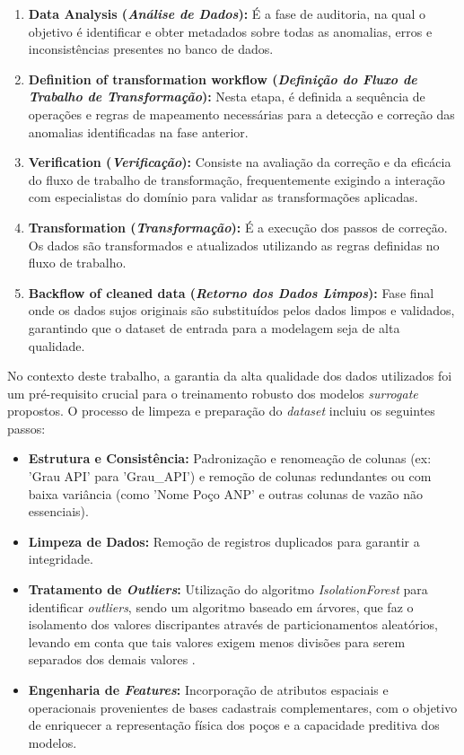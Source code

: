 \begin{enumerate}
    \item \textbf{Data Analysis (\textit{Análise de Dados}):} É a fase de auditoria, na qual o objetivo é identificar e obter metadados sobre todas as anomalias, erros e inconsistências presentes no banco de dados.
    \item \textbf{Definition of transformation workflow (\textit{Definição do Fluxo de Trabalho de Transformação}):} Nesta etapa, é definida a sequência de operações e regras de mapeamento necessárias para a detecção e correção das anomalias identificadas na fase anterior.
    \item \textbf{Verification (\textit{Verificação}):} Consiste na avaliação da correção e da eficácia do fluxo de trabalho de transformação, frequentemente exigindo a interação com especialistas do domínio para validar as transformações aplicadas.
    \item \textbf{Transformation (\textit{Transformação}):} É a execução dos passos de correção. Os dados são transformados e atualizados utilizando as regras definidas no fluxo de trabalho.
    \item \textbf{Backflow of cleaned data (\textit{Retorno dos Dados Limpos}):} Fase final onde os dados sujos originais são substituídos pelos dados limpos e validados, garantindo que o dataset de entrada para a modelagem seja de alta qualidade.
\end{enumerate}

No contexto deste trabalho, a garantia da alta qualidade dos dados utilizados foi um pré-requisito crucial para o treinamento robusto dos modelos \textit{surrogate} propostos. O processo de limpeza e preparação do \textit{dataset} incluiu os seguintes passos:

\begin{itemize}
    \item \textbf{Estrutura e Consistência:} Padronização e renomeação de colunas (ex: 'Grau API' para 'Grau\_API') e remoção de colunas redundantes ou com baixa variância (como 'Nome Poço ANP' e outras colunas de vazão não essenciais).
    \item \textbf{Limpeza de Dados:} Remoção de registros duplicados para garantir a integridade.
    \item \textbf{Tratamento de \textit{Outliers}:} Utilização do algoritmo \textit{IsolationForest} para identificar \textit{outliers}, sendo um algoritmo baseado em árvores, que faz o isolamento dos valores discripantes através de particionamentos aleatórios, levando em conta que tais valores exigem menos divisões para serem separados dos demais valores \cite{liu2008isolation}.
    \item \textbf{Engenharia de \textit{Features}:} Incorporação de atributos espaciais e operacionais provenientes de bases cadastrais complementares, com o objetivo de enriquecer a representação física dos poços e a capacidade preditiva dos modelos.
\end{itemize}


